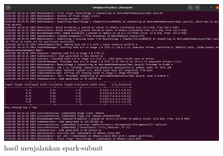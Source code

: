 \begin{enumerate}
\begin{figure}[!ht]
\includegraphics[width=\textwidth]{TugasKelompok/Kelompok5/spark-submit3}
\caption{hasil menjalankan spark-submit}
\label{gam:spark-submit}
\end{figure}
\end{enumerate}
